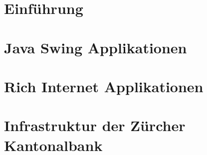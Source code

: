 \documentclass[
11pt, %
a4paper, %
BCOR25mm, %
DIV14, %
footsepline = false, %
headsepline, %
twoside, %
openright,
abstracton, %
listof=totocnumbered, %
bibliography=totocnumbered %
]{scrreprt}
\begin{document}
  
  
      
  
  \chapter{Einführung}\label{chapter:Einfuehrung}
  
    

  \cleardoublepage
   
  
  \chapter{Java Swing Applikationen}\label{chapter:JavaSwingApplikationen}

  

  \cleardoublepage
   
   
  \chapter{Rich Internet Applikationen}\label{chapter:RichInternetApplikationen}
  
  

  \cleardoublepage
  
   
  \chapter{Infrastruktur der Zürcher
  Kantonalbank}\label{chapter:InfrastrukturDerZuercherKantonalbank}
\end{document}
